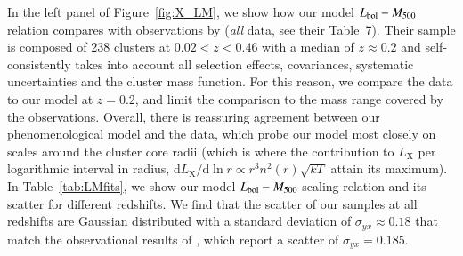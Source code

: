 \documentclass[traditabstract]{aa}
\newcommand{\rmn}{\mathrm}
\newcommand{\dd}{\mathrm{d}}
\begin{document}
In the left panel of Figure~\ref{fig:X_LM}, we show how our model
$L_{\rm{bol}}-M_{500}$ relation compares with observations by
\cite{2010MNRAS.406.1773M} (\emph{all} data, see their Table~7). Their sample is
composed of 238 clusters at $0.02<z<0.46$ with a median of $z \approx 0.2$ and
self-consistently takes into account all selection effects, covariances,
systematic uncertainties and the cluster mass function. For this reason, we
compare the \cite{2010MNRAS.406.1773M} data to our model at $z=0.2$, and limit
the comparison to the mass range covered by the observations. Overall, there is
reassuring agreement between our phenomenological model and the data, which
probe our model most closely on scales around the cluster core radii (which is
where the contribution to $L_{\rmn{X}}$ per logarithmic interval in radius, $\dd
L_{\rmn{X}}/\dd\ln r \propto r^3 n^2(r) \sqrt{kT}$ attain its maximum).  In
Table~\ref{tab:LMfits}, we show our model $L_{\rm{bol}}-M_{500}$ scaling
relation and its scatter for different redshifts. We find that the scatter of
our samples at all redshifts are Gaussian distributed with a standard deviation
of $\sigma_{yx} \approx 0.18$ that match the observational results of
\cite{2010MNRAS.406.1773M}, which report a scatter of $\sigma_{yx} = 0.185$.
\end{document}
